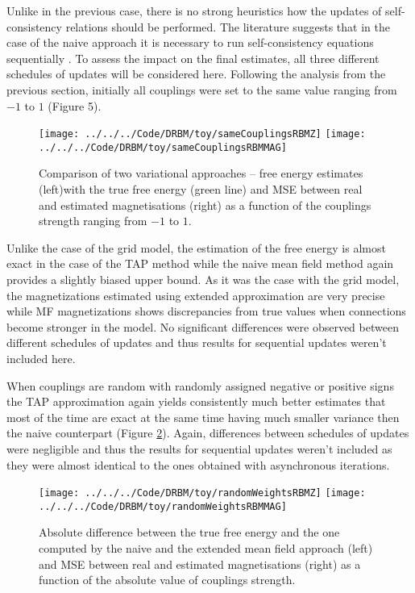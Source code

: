 Unlike in the previous case, there is no strong heuristics how the updates of self-consistency relations should be performed. The literature suggests that in the case of the naive approach it is necessary to run self-consistency equations sequentially \cite{welling2002new}. To assess the impact on the final estimates, all three different schedules of updates will be considered here. Following the analysis from the previous section, initially all couplings were set to the same value ranging from $-1$ to $1$  (Figure 5).
\begin{figure}[!htb]
%
\texttt{[image: ../../../Code/DRBM/toy/sameCouplingsRBMZ]}
\endminipage 
{}  
\texttt{[image: ../../../Code/DRBM/toy/sameCouplingsRBMMAG]}
\endminipage\hfill
  \caption[Results on RBM toy model with uniform couplings' strength]{Comparison of two  variational approaches -- free energy estimates (left)with the true free energy (green line) and MSE between real and estimated magnetisations (right) as a function of the couplings strength ranging from $-1$ to $1$.}
  \label{fig:rbmSame}
\end{figure}

Unlike the case of the grid model, the estimation of the free energy is almost exact in the case of the TAP method while the naive mean field method again provides a slightly biased upper bound. As it was the case with the grid model, the magnetizations estimated using extended approximation are very precise while MF magnetizations shows discrepancies from true values when connections become stronger in the model. No significant differences were observed between different schedules of updates and thus results for sequential updates weren't included here.

When couplings are random with randomly assigned negative or positive signs the TAP approximation again yields consistently much better estimates that most of the time are exact at the same time having much smaller variance then the naive counterpart (Figure \ref{fig:rbmRandom}). Again, differences between schedules of updates were negligible and thus the results for sequential updates weren't included as they were almost identical to the ones obtained with asynchronous iterations.
\begin{figure}[!htb]
%
\texttt{[image: ../../../Code/DRBM/toy/randomWeightsRBMZ]}
\endminipage 
{}  
\texttt{[image: ../../../Code/DRBM/toy/randomWeightsRBMMAG]}
\endminipage\hfill
  \caption[Results on RBM toy model with random couplings' strength]{Absolute difference between the true free energy and the one computed by the naive and the extended mean field approach (left) and MSE between real and estimated magnetisations (right) as a function of the absolute value of couplings strength.}
  \label{fig:rbmRandom}
\end{figure}

